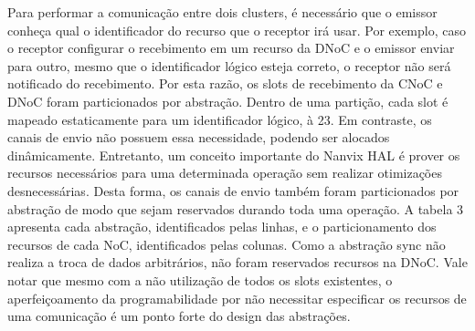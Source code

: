 			Para performar a comunicação entre dois clusters, é necessário que o emissor conheça qual o identificador do recurso que o receptor irá usar.
			Por exemplo, caso o receptor configurar o recebimento em um recurso da DNoC e o emissor enviar para outro, mesmo que o identificador lógico esteja correto, o receptor não será notificado do recebimento.
			Por esta razão, os slots de recebimento da CNoC e DNoC foram particionados por abstração.
			Dentro de uma partição, cada slot é mapeado estaticamente para um identificador lógico,  à 23.
			Em contraste, os canais de envio não possuem essa necessidade, podendo ser alocados dinâmicamente.
			Entretanto, um conceito importante do Nanvix HAL é prover os recursos necessários para uma determinada operação sem realizar otimizações desnecessárias.
			Desta forma, os canais de envio também foram particionados por abstração de modo que sejam reservados durando toda uma operação.
			A tabela 3 apresenta cada abstração, identificados pelas linhas, e o particionamento dos recursos de cada NoC, identificados pelas colunas.
			Como a abstração sync não realiza a troca de dados arbitrários, não foram reservados recursos na DNoC.
			Vale notar que mesmo com a não utilização de todos os slots existentes, o aperfeiçoamento da programabilidade por não necessitar especificar os recursos de uma comunicação é um ponto forte do design das abstrações.


